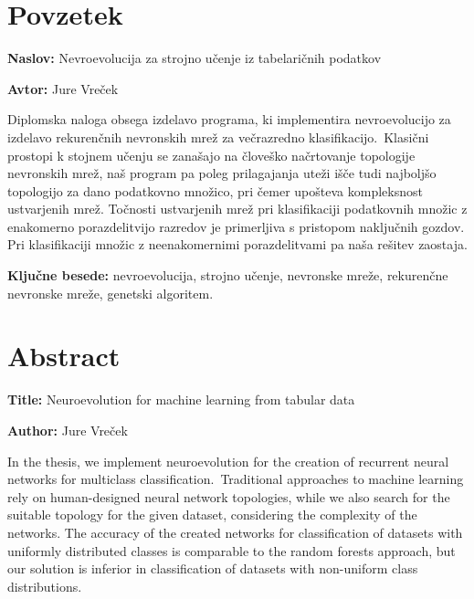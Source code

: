 \documentclass[a4paper,12pt,openright]{book}
\newcommand{\ttitle}{Nevroevolucija za strojno učenje iz tabelaričnih podatkov}
\newcommand{\ttitleEn}{Neuroevolution for machine learning from tabular data}
\newcommand{\tauthor}{Jure Vreček}
\newcommand{\tkeywords}{nevroevolucija, strojno učenje, nevronske mreže, rekurenčne nevronske mreže, genetski algoritem}
\newcommand{\clearemptydoublepage}{\newpage{\pagestyle{empty}\cleardoublepage}}
\begin{document}
    \chapter*{Povzetek}

    \noindent\textbf{Naslov:} \ttitle
    \bigskip

    \noindent\textbf{Avtor:} \tauthor
    \bigskip

    \noindent
    Diplomska naloga obsega izdelavo programa, ki implementira nevroevolucijo za izdelavo rekurenčnih nevronskih mrež za večrazredno
    klasifikacijo.\ Klasični prostopi k stojnem učenju se zanašajo na človeško načrtovanje topologije nevronskih mrež, naš
    program pa poleg prilagajanja uteži išče tudi najboljšo topologijo za dano podatkovno množico, pri čemer upošteva
    kompleksnost ustvarjenih mrež.
    Točnosti ustvarjenih mrež pri klasifikaciji podatkovnih množic z enakomerno porazdelitvijo razredov je primerljiva
    s pristopom naključnih gozdov.
    Pri klasifikaciji množic z neenakomernimi porazdelitvami pa naša rešitev zaostaja.

    \bigskip

    \noindent\textbf{Ključne besede:} \tkeywords.
    \clearemptydoublepage

    \chapter*{Abstract}

    \noindent\textbf{Title:} \ttitleEn
    \bigskip

    \noindent\textbf{Author:} \tauthor
    \bigskip

    \noindent
    In the thesis, we implement neuroevolution for the creation of recurrent neural networks
    for multiclass classification.\ Traditional approaches to machine learning rely on human-designed neural network
    topologies, while we also search for the suitable topology for the given dataset, considering
    the complexity of the networks.
    The accuracy of the created networks for classification of datasets with uniformly
    distributed classes is comparable to the random forests approach, but our solution is inferior in classification of
    datasets with non-uniform class distributions.
    \bigskip
\end{document}
